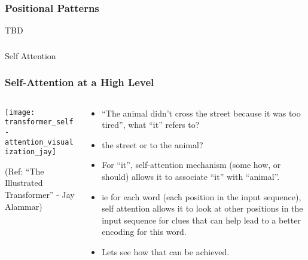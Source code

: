 \begin{frame}[fragile]\frametitle{Positional Patterns}

TBD
\end{frame}

\begin{frame}[fragile]\frametitle{}
\begin{center}
{\Large Self Attention}
\end{center}
\end{frame}

\begin{frame}[fragile]\frametitle{Self-Attention at a High Level}

\begin{columns}
    \begin{column}[T]{0.5\linewidth}
\begin{center}
\texttt{[image: transformer\_self-attention\_visualization\_jay]}


{\tiny (Ref: ``The Illustrated Transformer'' - Jay Alammar)}
\end{center}		

		\end{column}
    \begin{column}[T]{0.5\linewidth}

\begin{itemize}
\item ``The animal didn't cross the street because it was too tired'', what ``it'' refers to?
\item  the street or to the animal?
\item For “it”, self-attention mechanism (some how, or should) allows it to associate “it” with “animal”.
\item ie for each word (each position in the input sequence), self attention allows it to look at other positions in the input sequence for clues that can help lead to a better encoding for this word.
\item Lets see how that can be achieved.
\end{itemize}
    \end{column}
  \end{columns}
\end{frame}

